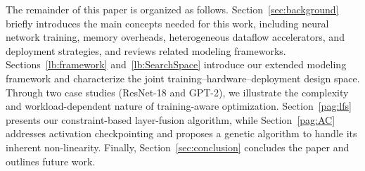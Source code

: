 \documentclass[lettersize,journal]{IEEEtran}
\newcommand{\RG}[1]{%
\todo[inline,color={cyan},size=\small]{%
\textbf{[RG]}~#1}%
}
\begin{document}
The remainder of this paper is organized as follows.
Section~\ref{sec:background} briefly introduces the main concepts needed for this work, including neural network training, memory overheads, heterogeneous dataflow accelerators, and deployment strategies, and reviews related modeling frameworks.
Sections~\ref{lb:framework} and~\ref{lb:SearchSpace} introduce our extended modeling framework and characterize the joint training--hardware--deployment design space. Through two case studies (ResNet-18 and GPT-2), we illustrate the complexity and workload-dependent nature of training-aware optimization.
Section~\ref{pag:lfs} presents our constraint-based layer-fusion algorithm, while Section~\ref{pag:AC} addresses activation checkpointing and proposes a genetic algorithm to handle its inherent non-linearity.
Finally, Section~\ref{sec:conclusion} concludes the paper and outlines future work.





\end{document}
